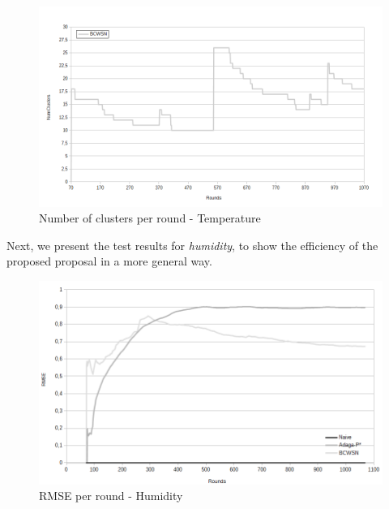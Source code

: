 \documentclass{acm_proc_article-sp}
\begin{document}
\begin{figure}[!htb]
\begin{center}
	\includegraphics[scale=0.32]{BCWSN-NumClustersxRound-PB.png}
	 \vspace*{-.6cm}
    \caption{Number of clusters per round - Temperature}
    \label{fig:num-clts}
\end{center}
\end{figure}

Next, we present the test results for {\it humidity}, to show the efficiency of the
proposed proposal in a more general way.

\begin{figure}[!htb]
\begin{center}
	\includegraphics[scale=0.28]{BCWSN-RMSExRound-BW-Hum.png}
	 \vspace*{-.6cm}
    \caption{RMSE per round - Humidity}
    \label{fig:rmse-hum}
\end{center}
\end{figure}
\vspace*{-.3cm}
\end{document}

